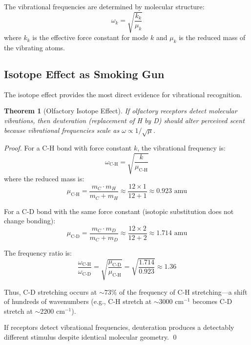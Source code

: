 \documentclass[12pt,a4paper]{article}
\newtheorem{theorem}{Theorem}
\begin{document}
The vibrational frequencies are determined by molecular structure:
\begin{equation}
\omega_k = \sqrt{\frac{k_k}{\mu_k}}
\end{equation}
where $k_k$ is the effective force constant for mode $k$ and $\mu_k$ is the reduced mass of the vibrating atoms.

\subsection{Isotope Effect as Smoking Gun}

The isotope effect provides the most direct evidence for vibrational recognition.

\begin{theorem}[Olfactory Isotope Effect]
\label{thm:isotope_effect}
If olfactory receptors detect molecular vibrations, then deuteration (replacement of H by D) should alter perceived scent because vibrational frequencies scale as $\omega \propto 1/\sqrt{\mu}$.
\end{theorem}

\begin{proof}
For a C-H bond with force constant $k$, the vibrational frequency is:
\begin{equation}
\omega_{\text{C-H}} = \sqrt{\frac{k}{\mu_{\text{C-H}}}}
\end{equation}
where the reduced mass is:
\begin{equation}
\mu_{\text{C-H}} = \frac{m_C \cdot m_H}{m_C + m_H} \approx \frac{12 \times 1}{12 + 1} \approx 0.923 \text{ amu}
\end{equation}

For a C-D bond with the same force constant (isotopic substitution does not change bonding):
\begin{equation}
\mu_{\text{C-D}} = \frac{m_C \cdot m_D}{m_C + m_D} \approx \frac{12 \times 2}{12 + 2} \approx 1.714 \text{ amu}
\end{equation}

The frequency ratio is:
\begin{equation}
\frac{\omega_{\text{C-H}}}{\omega_{\text{C-D}}} = \sqrt{\frac{\mu_{\text{C-D}}}{\mu_{\text{C-H}}}} = \sqrt{\frac{1.714}{0.923}} \approx 1.36
\end{equation}

Thus, C-D stretching occurs at $\sim 73\%$ of the frequency of C-H stretching—a shift of hundreds of wavenumbers (e.g., C-H stretch at $\sim 3000$ cm$^{-1}$ becomes C-D stretch at $\sim 2200$ cm$^{-1}$).

If receptors detect vibrational frequencies, deuteration produces a detectably different stimulus despite identical molecular geometry. \qed
\end{proof}
\end{document}

